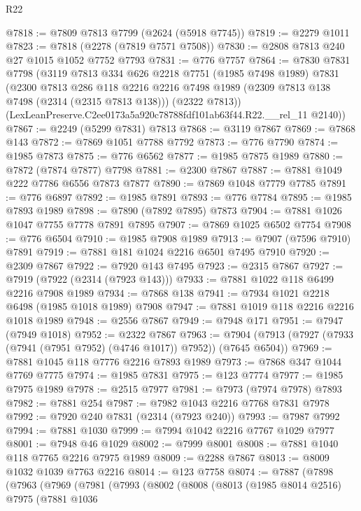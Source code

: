 \begin{lexlean}{R22}
\begin{coremodule}
@7818 := @7809 @7813 @7799 (@2624 (@5918 @7745))
@7819 := @2279 @1011
@7823 := @7818 (@2278 (@7819 @7571 @7508))
@7830 := @2808 @7813 @240 @27 @1015 @1052 @7752 @7793
@7831 := @776 @7757
@7864 := @7830
    @7831
    @7798
    (@3119
      @7813
      @334
      @626
      @2218
      @7751
      (@1985 @7498 @1989)
      @7831
      (@2300
        @7813
        @286
        @118
        @2216
        @2216
        @7498
        @1989
        (@2309 @7813 @138 @7498 (@2314 (@2315 @7813 @138)))
        (@2322 @7813))
      (LexLeanPreserve.C2ee0173a5a920c78788fdf101ab63f44.R22.__rel_11 @2140))
@7867 := @2249 (@5299 @7831) @7813
@7868 := @3119 @7867
@7869 := @7868 @143
@7872 := @7869 @1051 @7788 @7792
@7873 := @776 @7790
@7874 := @1985 @7873
@7875 := @776 @6562
@7877 := @1985 @7875 @1989
@7880 := @7872 (@7874 @7877) @7798
@7881 := @2300 @7867
@7887 := @7881 @1049 @222 @7786 @6556 @7873 @7877
@7890 := @7869 @1048 @7779 @7785
@7891 := @776 @6897
@7892 := @1985 @7891
@7893 := @776 @7784
@7895 := @1985 @7893 @1989
@7898 := @7890 (@7892 @7895) @7873
@7904 := @7881 @1026 @1047 @7755 @7778 @7891 @7895
@7907 := @7869 @1025 @6502 @7754
@7908 := @776 @6504
@7910 := @1985 @7908 @1989
@7913 := @7907 (@7596 @7910) @7891
@7919 := @7881 @181 @1024 @2216 @6501 @7495 @7910
@7920 := @2309 @7867
@7922 := @7920 @143 @7495
@7923 := @2315 @7867
@7927 := @7919 (@7922 (@2314 (@7923 @143)))
@7933 := @7881 @1022 @118 @6499 @2216 @7908 @1989
@7934 := @7868 @138
@7941 := @7934 @1021 @2218 @6498 (@1985 @1018 @1989) @7908
@7947 := @7881 @1019 @118 @2216 @2216 @1018 @1989
@7948 := @2556 @7867
@7949 := @7948 @171
@7951 := @7947 (@7949 @1018)
@7952 := @2322 @7867
@7963 := @7904 (@7913 (@7927 (@7933 (@7941 (@7951 @7952) (@4746 @1017)) @7952)) (@7645 @6504))
@7969 := @7881 @1045 @118 @7776 @2216 @7893 @1989
@7973 := @7868 @347 @1044 @7769 @7775
@7974 := @1985 @7831
@7975 := @123 @7774
@7977 := @1985 @7975 @1989
@7978 := @2515 @7977
@7981 := @7973 (@7974 @7978) @7893
@7982 := @7881 @254
@7987 := @7982 @1043 @2216 @7768 @7831 @7978
@7992 := @7920 @240 @7831 (@2314 (@7923 @240))
@7993 := @7987 @7992
@7994 := @7881 @1030
@7999 := @7994 @1042 @2216 @7767 @1029 @7977
@8001 := @7948 @46 @1029
@8002 := @7999 @8001
@8008 := @7881 @1040 @118 @7765 @2216 @7975 @1989
@8009 := @2288 @7867
@8013 := @8009 @1032 @1039 @7763 @2216
@8014 := @123 @7758
@8074 := @7887
    (@7898
      (@7963
        (@7969
          (@7981
            (@7993
              (@8002
                (@8008
                  (@8013
                    (@1985 @8014 @2516)
                    @7975
                    (@7881
                      @1036

\end{coremodule}
\end{lexlean}
